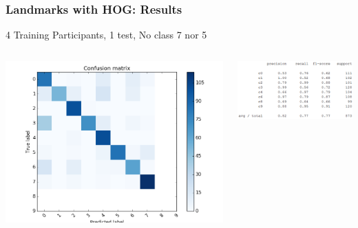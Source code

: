 \documentclass{beamer}
\begin{document}
	
	
	\begin{frame}
		\frametitle{Landmarks with HOG: Results}
		4 Training Participants, 1 test, No class 7 nor 5
		\begin{columns}
			\begin{column}{0.5\textwidth}
				\begin{center}
					\includegraphics[width=\textwidth]{mult_HOG/4c01234689matComparable}\\			
				\end{center}
			\end{column}
			\begin{column}{0.5\textwidth}
				\begin{center}
					\includegraphics[width=\textwidth]{mult_HOG/4c01234689repComparable}
				\end{center}
			\end{column}
		\end{columns}		
	\end{frame}	
	
\end{document}
